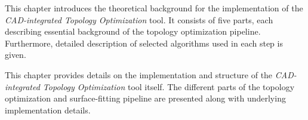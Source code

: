 \noindent This chapter introduces the theoretical background for the implementation of the \emph{CAD-integrated Topology Optimization} tool. It consists of five parts, each describing essential background of the topology optimization pipeline. Furthermore, detailed description of selected algorithms used in each step is given.
\\

  \vspace{1mm}

\noindent This chapter provides details on the implementation and structure of the \emph{CAD-integrated Topology Optimization} tool itself. The different parts of the topology optimization and surface-fitting pipeline are presented along with underlying implementation details.
\\
